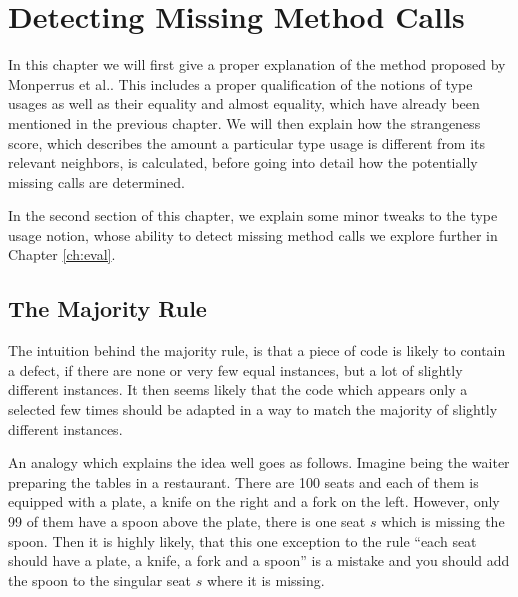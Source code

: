 \chapter{Detecting Missing Method Calls}\label{ch:dmmc}

In this chapter we will first give a proper explanation of the method proposed by Monperrus et al..
This includes a proper qualification of the notions of type usages as well as their equality and almost equality, which have already been mentioned in the previous chapter.
We will then explain how the strangeness score, which describes the amount a particular type usage is different from its relevant neighbors, is calculated, before going into detail how the potentially missing calls are determined.

In the second section of this chapter, we explain some minor tweaks to the type usage notion, whose ability to detect missing method calls we explore further in Chapter \ref{ch:eval}.

\section{The Majority Rule}

The intuition behind the majority rule, is that a piece of code is likely to contain a defect, if there are none or very few equal instances, but a lot of slightly different instances.
It then seems likely that the code which appears only a selected few times should be adapted in a way to match the majority of slightly different instances.

An analogy which explains the idea well goes as follows.
Imagine being the waiter preparing the tables in a restaurant.
There are 100 seats and each of them is equipped with a plate, a knife on the right and a fork on the left.
However, only 99 of them have a spoon above the plate, there is one seat $s$ which is missing the spoon.
Then it is highly likely, that this one exception to the rule ``each seat should have a plate, a knife, a fork and a spoon'' is a mistake and you should add the spoon to the singular seat $s$ where it is missing.

